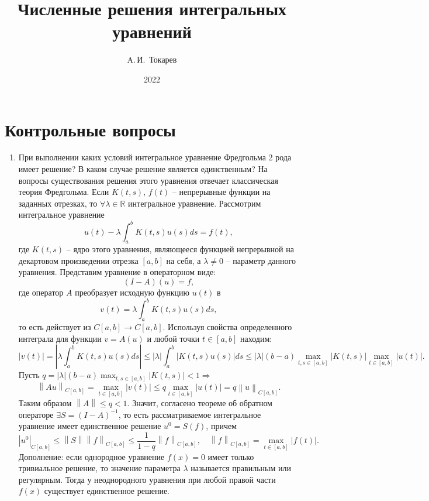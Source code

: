 \documentclass[12pt, a4paper]{article}
\title{Численные решения интегральных уравнений}
\author{A.\,И.~Токарев}
\date{2022}
\newcommand{\norm}[1]{\left\lVert#1\right\rVert}
\begin{document}
    \maketitle
    \tableofcontents 

    \section{Контрольные вопросы}

    \begin{enumerate}
    \item При выполнении каких условий интегральное уравнение Фредгольма 2 рода имеет решение? В каком случае решение является единственным?
    На вопросы существования решения этого уравнения отвечает классическая теория Фредгольма.
    Если $ K(t, s),\,f(t) $ -- непрерывные функции на заданных отрезках, то $\forall \lambda \in \mathbb{R}$ интегральное уравнение. Рассмотрим интегральное уравнение 
    \[
        u(t) - \lambda \displaystyle \int_a^b K(t, s) u(s) ds = f(t),
    \]
    \noindent где $ K(t, s) $ -- ядро этого уравнения, являющееся функцией непрерывной на декартовом произведении отрезка $[a, b]$ на себя, а $ \lambda \neq 0$ -- параметр данного уравнения. Представим уравнение в операторном виде:
    \[
      (I - A)(u) = f,  
    \]
    \noindent где оператор $A$ преобразует исходную функцию $ u(t) $ в 
    \[
      v(t) = \lambda \displaystyle \int_a^b K(t, s)u(s)ds,  
    \]
    \noindent то есть действует из $C[a,b] \rightarrow C[a, b]$. Используя свойства определенного интеграла для функции $ v = A(u) $ и любой точки $ t \in [a, b] $ находим:
    \[
      | v(t) | = | \lambda \displaystyle \int_a^b K(t, s)u(s) ds | \leq | \lambda | \displaystyle \int_a^b | K(t, s) u(s) | ds \leq |\lambda|(b-a) \max_{t, s \in [a, b]} | K(t, s) | \max_{t \in [a, b]} |u(t)|.
    \]
    Пусть $ q = | \lambda |(b-a) \displaystyle \max_{t, s \in [a, b]} | K(t, s) | < 1  \Rightarrow $
    \[
      \norm{ Au }_{C[a, b]} = \max_{t \in [a, b]} | v(t) | \leq q \max_{ t \in [a, b] } | u(t) | = q \norm{u}_{C[a, b]}.
    \]
    Таким образом $ \norm{A} \leq q < 1 $. Значит, согласено теореме об обратном операторе $ \exists S = (I - A)^{-1} $, то есть рассматриваемое интегральное уравнение имеет единственное решение $u^0 = S(f)$, причем 
    \[
      | u^0 |_{C[a, b]} \leq \norm{S} \norm{f}_{C[a, b]} \leq \dfrac{1}{1 - q} \norm{f}_{C[a, b]}, \quad \norm{f}_{C[a, b]} = \max_{t \in [a, b]} |f(t)|.
    \]
    Дополнение: если однородное уравнение $ f(x) = 0 $ имеет только тривиальное решение, то значение параметра $ \lambda $ называется правильным или регулярным. Тогда у неоднородного уравнения при любой правой части $ f(x) $ существует единственное решение.


\end{enumerate}
\end{document}

